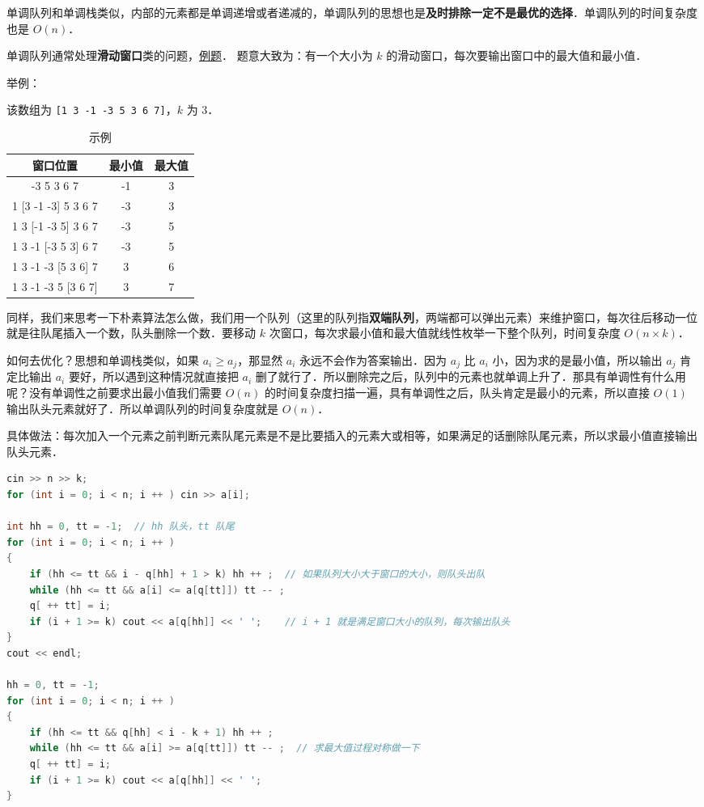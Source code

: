 
单调队列和单调栈类似，内部的元素都是单调递增或者递减的，单调队列的思想也是\textbf{及时排除一定不是最优的选择}．单调队列的时间复杂度也是 $O(n)$．

单调队列通常处理\textbf{滑动窗口}类的问题，\href{http://poj.org/problem?id=2823}{例题}．
题意大致为：有一个大小为 $k$ 的滑动窗口，每次要输出窗口中的最大值和最小值．

举例：

该数组为 \verb|[1 3 -1 -3 5 3 6 7]|，$k$ 为 $3$．

\begin{table}[ht]
\centering
\caption{示例}\label{Mqueue_tab1}
\begin{tabular}{|c|c|c|}
\hline
窗口位置	 & 最小值	 & 最大值 \\
\hline
[1 3 -1] -3 5 3 6 7	 & -1 & 3 \\
\hline
1 [3 -1 -3] 5 3 6 7	 & -3 & 3 \\
\hline
1 3 [-1 -3 5] 3 6 7	 & -3 & 5 \\
\hline
1 3 -1 [-3 5 3] 6 7	 & -3 & 5 \\
\hline
1 3 -1 -3 [5 3 6] 7	 & 3 & 6 \\
\hline
1 3 -1 -3 5 [3 6 7]	 & 3 & 7 \\
\hline
\end{tabular}
\end{table}

同样，我们来思考一下朴素算法怎么做，我们用一个队列（这里的队列指\textbf{双端队列}，两端都可以弹出元素）来维护窗口，每次往后移动一位就是往队尾插入一个数，队头删除一个数．要移动 $k$ 次窗口，每次求最小值和最大值就线性枚举一下整个队列，时间复杂度 $O(n\times k)$．

如何去优化？思想和单调栈类似，如果 $a_i \geqslant a_j$，那显然 $a_i$ 永远不会作为答案输出．因为 $a_j$ 比 $a_i$ 小，因为求的是最小值，所以输出 $a_j$ 肯定比输出 $a_i$ 要好，所以遇到这种情况就直接把 $a_i$ 删了就行了．所以删除完之后，队列中的元素也就单调上升了．那具有单调性有什么用呢？没有单调性之前要求出最小值我们需要 $O(n)$ 的时间复杂度扫描一遍，具有单调性之后，队头肯定是最小的元素，所以直接 $O(1)$ 输出队头元素就好了．所以单调队列的时间复杂度就是 $O(n)$．

具体做法：每次加入一个元素之前判断元素队尾元素是不是比要插入的元素大或相等，如果满足的话删除队尾元素，所以求最小值直接输出队头元素．

\begin{lstlisting}[language=cpp]
cin >> n >> k;
for (int i = 0; i < n; i ++ ) cin >> a[i];

int hh = 0, tt = -1;  // hh 队头，tt 队尾
for (int i = 0; i < n; i ++ )
{
    if (hh <= tt && i - q[hh] + 1 > k) hh ++ ;  // 如果队列大小大于窗口的大小，则队头出队
    while (hh <= tt && a[i] <= a[q[tt]]) tt -- ;
    q[ ++ tt] = i;
    if (i + 1 >= k) cout << a[q[hh]] << ' ';    // i + 1 就是满足窗口大小的队列，每次输出队头
}
cout << endl;

hh = 0, tt = -1;
for (int i = 0; i < n; i ++ )
{
    if (hh <= tt && q[hh] < i - k + 1) hh ++ ;
    while (hh <= tt && a[i] >= a[q[tt]]) tt -- ;  // 求最大值过程对称做一下
    q[ ++ tt] = i;
    if (i + 1 >= k) cout << a[q[hh]] << ' ';
}
\end{lstlisting}